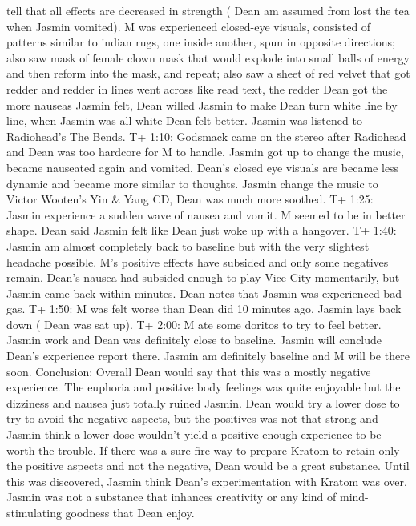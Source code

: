 \documentclass[12pt]{book}
\begin{document}
tell that all effects are decreased in strength ( Dean am assumed from lost the tea when Jasmin vomited). M was experienced closed-eye visuals, consisted of patterns similar to indian rugs, one inside another, spun in opposite directions; also saw mask of female clown mask that would explode into small balls of energy and then reform into the mask, and repeat; also saw a sheet of red velvet that got redder and redder in lines went across like read text, the redder Dean got the more nauseas Jasmin felt, Dean willed Jasmin to make Dean turn white line by line, when Jasmin was all white Dean felt better. Jasmin was listened to Radiohead's The Bends. T+ 1:10: Godsmack came on the stereo after Radiohead and Dean was too hardcore for M to handle. Jasmin got up to change the music, became nauseated again and vomited. Dean's closed eye visuals are became less dynamic and became more similar to thoughts. Jasmin change the music to Victor Wooten's Yin \& Yang CD, Dean was much more soothed. T+ 1:25: Jasmin experience a sudden wave of nausea and vomit. M seemed to be in better shape. Dean said Jasmin felt like Dean just woke up with a hangover. T+ 1:40: Jasmin am almost completely back to baseline but with the very slightest headache possible. M's positive effects have subsided and only some negatives remain. Dean's nausea had subsided enough to play Vice City momentarily, but Jasmin came back within minutes. Dean notes that Jasmin was experienced bad gas. T+ 1:50: M was felt worse than Dean did 10 minutes ago, Jasmin lays back down ( Dean was sat up). T+ 2:00: M ate some doritos to try to feel better. Jasmin work and Dean was definitely close to baseline. Jasmin will conclude Dean's experience report there. Jasmin am definitely baseline and M will be there soon. Conclusion: Overall Dean would say that this was a mostly negative experience. The euphoria and positive body feelings was quite enjoyable but the dizziness and nausea just totally ruined Jasmin. Dean would try a lower dose to try to avoid the negative aspects, but the positives was not that strong and Jasmin think a lower dose wouldn't yield a positive enough experience to be worth the trouble. If there was a sure-fire way to prepare Kratom to retain only the positive aspects and not the negative, Dean would be a great substance. Until this was discovered, Jasmin think Dean's experimentation with Kratom was over. Jasmin was not a substance that inhances creativity or any kind of mind-stimulating goodness that Dean enjoy.
\end{document}
